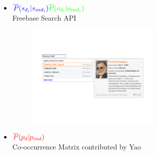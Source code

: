 \documentclass{beamer}
\begin{document}
\begin{frame}
\begin{itemize}
	\item $\textcolor{blue}{\overline{P}(s_{d_{i}} |s_{ind_{i}})} \textcolor{green}{\overline{P}(o_{d_{i}} |o_{ind_{i}})}$ \\
		Freebase Search API
		\begin{figure}
		\centering\includegraphics[width=0.6\textwidth]{introduction/api.pdf}
		\end{figure}
	\item $\textcolor{red}{\overline{P}(p_{d} |p_{ind})}$ \\
		Co-occurrence Matrix contributed by Yao
\end{itemize}
\end{frame}
\end{document}
